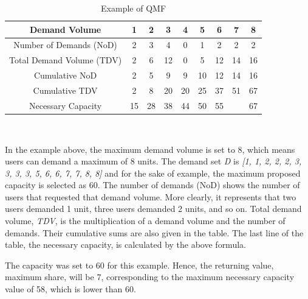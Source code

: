 \documentclass[a4paper,12pt]{report}
\begin{document}
\begin{table}[H]
	\begin{tabular}{|c|c|c|c|c|c|c|c|c|}
		\hline
		Demand Volume             & 1  & 2  & 3  & 4  & 5  & 6  & 7                                                          & 8  \\ \hline
		Number of Demands (NoD)   & 2  & 3  & 4  & 0  & 1  & 2  & 2                                                          & 2  \\ \hline
		Total Demand Volume (TDV) & 2  & 6  & 12 & 0  & 5  & 12 & 14                                                         & 16 \\ \hline
		Cumulative NoD            & 2  & 5  & 9  & 9  & 10 & 12 & 14                                                         & 16 \\ \hline
		Cumulative TDV            & 2  & 8  & 20 & 20 & 25 & 37 & 51                                                         & 67 \\ \hline
		Necessary Capacity        & 15 & 28 & 38 & 44 & 50 & 55 & \cellcolor[HTML]{34FF34}{\color[HTML]{000000} \textbf{58}} & 67 \\ \hline
	\end{tabular}
\\
\centering\caption{Example of QMF}
\end{table}


In the example above, the maximum demand volume is set to 8, which means users can demand a maximum of 8 units. The demand set \textit{D} is \textit{[1, 1, 2, 2, 2, 3, 3, 3, 3, 5, 6, 6, 7, 7, 8, 8]} and for the sake of example, the maximum proposed capacity is selected as 60. The number of demands (NoD) shows the number of users that requested that demand volume. More clearly, it represents that two users demanded 1 unit, three users demanded 2 units, and so on. Total demand volume, \textit{TDV}, is the multiplication of a demand volume and the number of demands. Their cumulative sums are also given in the table. The last line of the table, the necessary capacity, is calculated by the above formula.

The capacity was set to 60 for this example. Hence, the returning value, maximum share, will be 7, corresponding to the maximum necessary capacity value of 58, which is lower than 60.
\end{document}
